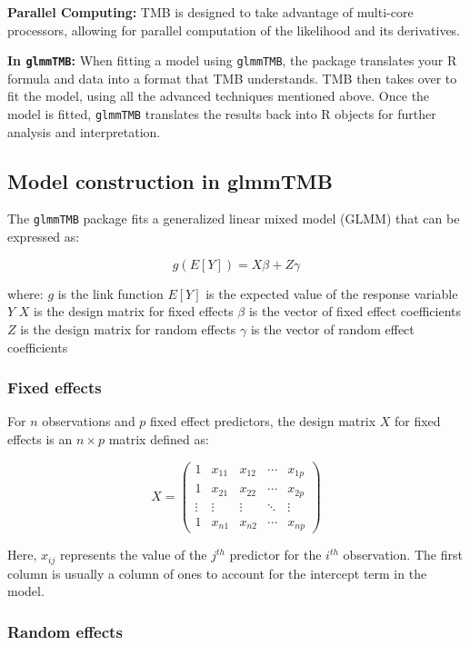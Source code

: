 \documentclass[12pt, twoside,hidelinks]{article}
\theoremstyle{definition}
\numberwithin{equation}{section}
\begin{document}
\textbf{Parallel Computing:} TMB is designed to take advantage of multi-core processors, allowing for parallel computation of the likelihood and its derivatives.
\newline

\textbf{In \texttt{glmmTMB}:} When fitting a model using \texttt{glmmTMB}, the package translates your R formula and data into a format that TMB understands. TMB then takes over to fit the model, using all the advanced techniques mentioned above. Once the model is fitted, \texttt{glmmTMB} translates the results back into R objects for further analysis and interpretation.

\subsection{Model construction in glmmTMB}

The \texttt{glmmTMB} package fits a generalized linear mixed model (GLMM) that can be expressed as:

\[
g(E[Y]) = X\beta + Z\gamma
\]

where:
\( g \) is the link function
\( E[Y] \) is the expected value of the response variable \( Y \)
\( X \) is the design matrix for fixed effects
\( \beta \) is the vector of fixed effect coefficients
\( Z \) is the design matrix for random effects
\( \gamma \) is the vector of random effect coefficients

\subsubsection{Fixed effects}

For \( n \) observations and \( p \) fixed effect predictors, the design matrix \( X \) for fixed effects is an \( n \times p \) matrix defined as:

\[
X = \begin{pmatrix}
1 & x_{11} & x_{12} & \cdots & x_{1p} \\
1 & x_{21} & x_{22} & \cdots & x_{2p} \\
\vdots & \vdots & \vdots & \ddots & \vdots \\
1 & x_{n1} & x_{n2} & \cdots & x_{np}
\end{pmatrix}
\]

Here, \( x_{ij} \) represents the value of the \( j^{th} \) predictor for the \( i^{th} \) observation. The first column is usually a column of ones to account for the intercept term in the model.

\subsubsection{Random effects}
\end{document}
